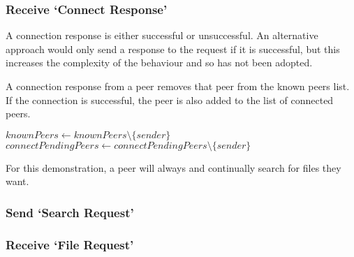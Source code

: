 \subsubsection{Receive `Connect Response'}

A connection response is either successful or unsuccessful.  An alternative
approach would only send a response to the request if it is successful, but this
increases the complexity of the behaviour and so has not been adopted.

A connection response from a peer removes that peer from the known peers list.
If the connection is successful, the peer is also added to the list of connected
peers.

\begin{algorithm}[H]

  $knownPeers \leftarrow knownPeers \setminus \{sender\}$\;
  $connectPendingPeers \leftarrow connectPendingPeers \setminus \{sender\}$\;
\end{algorithm}

For this demonstration, a peer will always and continually search for files they
want.

\subsubsection{Send `Search Request'}

\begin{algorithm}[H]

\end{algorithm}

\subsubsection{Receive `File Request'}

